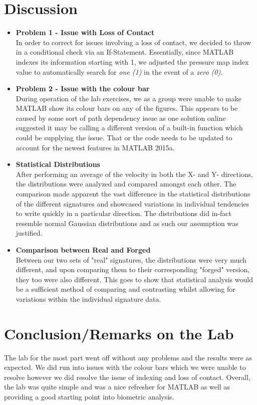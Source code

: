 \documentclass[a4paper]{article}
\begin{document}
\section{Discussion}
	\begin{itemize}
    \item \textbf{Problem 1 - Issue with Loss of Contact} \\ In order to correct for issues involving a loss of contact, we decided to throw in a conditional check via an If-Statement. Essentially, since MATLAB indexes its information starting with 1, we adjusted the pressure map index value to automatically search for \emph{one (1)} in the event of a \emph{zero (0)}.
    \item \textbf{Problem 2 - Issue with the colour bar} \\ During operation of the lab exercises, we as a group were unable to make MATLAB show its colour bars on any of the figures. This appears to be caused by some sort of path dependency issue as one solution online suggested it may be calling a different version of a built-in function which could be supplying the issue. That or the code needs to be updated to account for the newest features in MATLAB 2015a.
    \item \textbf{Statistical Distributions} \\ After performing an average of the velocity in both the X- and Y- directions, the distributions were analyzed and compared amongst each other. The comparison made apparent the vast difference in the statistical distributions of the different signatures and showcased variations in individual tendencies to write quickly in a particular direction. The distributions did in-fact resemble normal Gaussian distributions and as such our assumption was justified. 
    \item \textbf{Comparison between Real and Forged} \\ Between our two sets of "real" signatures, the distributions were very much different, and upon comparing them to their corresponding "forged" version, they too were also different. This goes to show that statistical analysis would be a sufficient method of comparing and contrasting whilst allowing for variations within the individual signature data.
    \end{itemize}

\section{Conclusion/Remarks on the Lab}
	The lab for the most part went off without any problems and the results were as expected. We did run into issues with the colour bars which we were unable to resolve however we did resolve the issue of indexing and loss of contact. Overall, the lab was quite simple and was a nice refresher for MATLAB as well as providing a good starting point into biometric analysis.
\pagebreak
\end{document}
